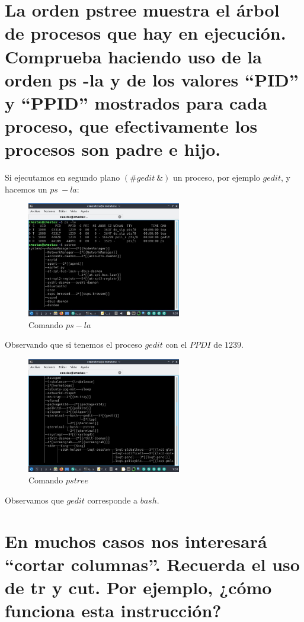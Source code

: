 \documentclass[12pt]{article}
\begin{document}
\section{La orden pstree muestra el árbol de procesos que hay en ejecución. Comprueba haciendo uso de la orden ps -la y de los valores “PID” y “PPID” mostrados para cada proceso, que efectivamente los procesos son padre e hijo.}

Si ejecutamos en segundo plano $(\#gedit~\&)$ un proceso, por ejemplo $gedit$, y hacemos un $ps~-la$:

\begin{figure}[h]
    \centering
    \includegraphics[width=0.6\textwidth]{images/screenA05.jpg}
    \caption{Comando $ps -la$}
\end{figure}

Observando que si tenemos el proceso $gedit$ con el $PPDI$ de $1239$.

\begin{figure}[h]
    \centering
    \includegraphics[width=0.6\textwidth]{images/screenA06.jpg}
    \caption{Comando $pstree$}
\end{figure}

Observamos que $gedit$ corresponde a $bash$.

\clearpage
\newpage

\section{En muchos casos nos interesará “cortar columnas”. Recuerda el uso de tr y cut. Por ejemplo, ¿cómo funciona esta instrucción?}
\end{document}
